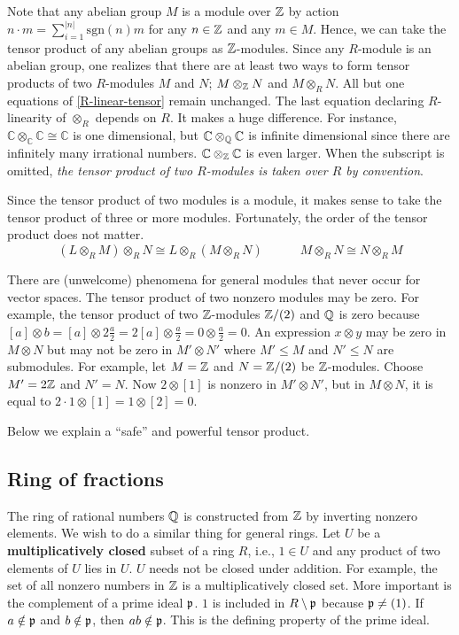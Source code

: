 Note that any abelian group $M$ is a module over $\mathbb{Z}$ by action $n \cdot m = \sum_{i=1}^{|n|} \mathrm{sgn}(n)m$
for any $n \in \mathbb{Z}$ and any $m \in M$.
Hence, we can take the tensor product of any abelian groups as $\mathbb{Z}$-modules.
Since any $R$-module is an abelian group,
one realizes that there are at least two ways to form tensor products of two $R$-modules $M$ and $N$;
$M \otimes_{\mathbb{Z}} N$ and $M \otimes_R N$.
All but one equations of \eqref{R-linear-tensor} remain unchanged.
The last equation declaring $R$-linearity of $\otimes_R$ depends on $R$.
It makes a huge difference.
For instance, $\mathbb{C} \otimes_\mathbb{C} \mathbb{C} \cong \mathbb{C}$ is one dimensional,
but $\mathbb{C} \otimes_{\mathbb{Q}} \mathbb{C}$ is infinite dimensional
since there are infinitely many irrational numbers.
$\mathbb{C} \otimes_{\mathbb{Z}} \mathbb{C}$ is even larger.
When the subscript is omitted, {\em the tensor product of two $R$-modules is taken over $R$ by convention}.

Since the tensor product of two modules is a module,
it makes sense to take the tensor product of three or more modules.
Fortunately, the order of the tensor product does not matter.
\[
 (L \otimes_R M) \otimes_R N \cong L \otimes_R (M \otimes_R N) \quad  \quad \quad M \otimes_R N \cong N \otimes_R M
\]


There are (unwelcome) phenomena for general modules that never occur for vector spaces.
The tensor product of two nonzero modules may be zero.
For example, the tensor product of two $\mathbb{Z}$-modules $\mathbb{Z}/(2)$ and $\mathbb{Q}$ is zero
because $[a] \otimes b = [a] \otimes 2\frac{a}{2} = 2[a] \otimes \frac{a}{2} = 0 \otimes \frac{a}{2} = 0$.
An expression $x \otimes y$ may be zero in $M \otimes N$ but may not be zero in $M' \otimes N'$
where $M' \le M$ and $N' \le N$ are submodules.
For example, let $M=\mathbb{Z}$ and $N = \mathbb{Z}/(2)$ be $\mathbb{Z}$-modules. Choose $M' = 2\mathbb{Z}$ and $N' = N$.
Now $2 \otimes [1]$ is nonzero in $M' \otimes N'$, 
but in $M \otimes N$, it is equal to $2 \cdot 1 \otimes [1] = 1 \otimes [2] = 0$.


Below we explain a ``safe'' and powerful tensor product.

\subsection*{Ring of fractions}

The ring of rational numbers $\mathbb{Q}$ is constructed from $\mathbb{Z}$ by inverting nonzero elements.
We wish to do a similar thing for general rings.
Let $U$ be a {\bf multiplicatively closed} subset of a ring $R$,
i.e., $1 \in U$ and any product of two elements of $U$ lies in $U$.
$U$ needs not be closed under addition.
For example, the set of all nonzero numbers in $\mathbb{Z}$ is a multiplicatively closed set.
More important is the complement of a prime ideal $\mathfrak{p}$.
$1$ is included in $R \setminus \mathfrak{p}$ because $\mathfrak{p} \neq (1)$.
If $a \notin \mathfrak{p}$ and $b \notin \mathfrak{p}$, then $ab \notin \mathfrak{p}$.
This is the defining property of the prime ideal.

